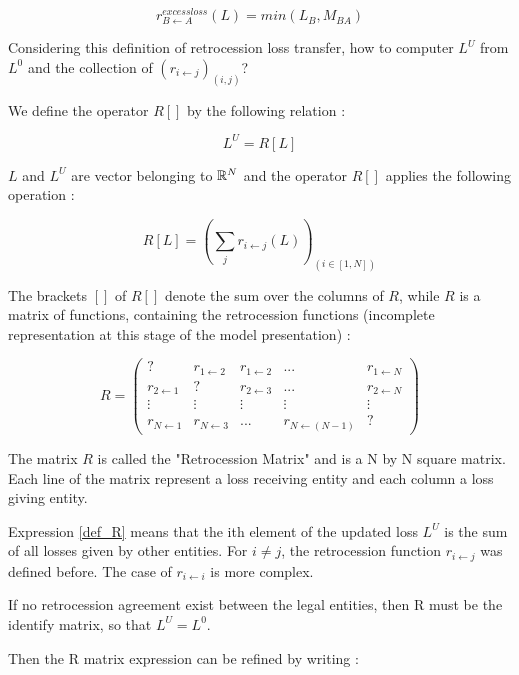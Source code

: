 \begin{equation}
    r_{B \gets A}^{excess loss}(L)  =  min(L_B, M_{BA})
\end{equation}


Considering this definition of retrocession loss transfer, how to computer $L^U$ from $L^0$ and the collection of $(r_{i \gets j})_{(i, j)}$?

We define the operator $R[]$ by the following relation :

\begin{equation}
    L^U = R[L]
\end{equation}

$L$ and $L^U$ are vector belonging to $\mathbb{R}^N$ and the operator $R[]$ applies the following operation :

\begin{equation}
\label{def_R}
    R[L] = \left( \sum_j r_{i \gets j}(L) \right)_{(i \in [1, N])}
\end{equation}

The brackets $[]$ of $R[]$ denote the sum over the columns of $R$, while $R$ is a matrix of functions, containing the retrocession functions (incomplete representation at this stage of the model presentation) :

\begin{equation}
R = 
\begin{pmatrix}
? & r_{1 \gets 2} & r_{1 \gets 2} & ... & r_{1 \gets N}\\
r_{2 \gets 1} & ? & r_{2 \gets 3} & ... & r_{2 \gets N}\\
\vdots & \vdots & \vdots & \vdots & \vdots\\
r_{N \gets 1} & r_{N \gets 3} & ... & r_{N \gets (N-1)} & ?
\end{pmatrix}
\end{equation}

The matrix $R$ is called the "Retrocession Matrix" and is a N by N square matrix. Each line of the matrix represent a loss receiving entity and each column a loss giving entity.

Expression \ref{def_R} means that the ith element of the updated loss $L^U$ is the sum of all losses given by other entities. For $i \neq j$, the retrocession function $r_{i \gets j}$ was defined before. The case of $r_{i \gets i}$ is more complex.

If no retrocession agreement exist between the legal entities, then R must be the identify matrix, so that $L^U = L^0$.

Then the R matrix expression can be refined by writing :

